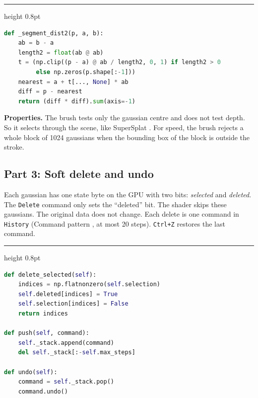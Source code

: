 \documentclass[9pt,twocolumn,a4paper]{extarticle}
\newenvironment{codebox}{\par\vspace{5pt}\noindent\begin{minipage}{\columnwidth}\hrule height 0.8pt\vspace{2pt}}{\end{minipage}\par\vspace{5pt}\noindent\ignorespaces}
\newcommand{\code}[1]{\texttt{#1}}
\begin{document}
\begin{codebox}
\begin{lstlisting}[language=Python,caption={\code{editor/brush.py}, \code{BrushTool.\_segment\_dist2}: capsule test},label={lst:capsule}]
def _segment_dist2(p, a, b):
    ab = b - a
    length2 = float(ab @ ab)
    t = (np.clip((p - a) @ ab / length2, 0, 1) if length2 > 0
         else np.zeros(p.shape[:-1]))
    nearest = a + t[..., None] * ab
    diff = p - nearest
    return (diff * diff).sum(axis=-1)
\end{lstlisting}
\end{codebox} 

\textbf{Properties.} The brush tests only the gaussian centre and does not test depth. So it selects through the scene, like SuperSplat \cite{supersplat}. For speed, the brush rejects a whole block of 1024 gaussians when the bounding box of the block is outside the stroke.

\subsection{Part 3: Soft delete and undo}
Each gaussian has one state byte on the GPU with two bits: \emph{selected} and \emph{deleted}. The \code{Delete} command only sets the ``deleted'' bit. The shader skips these gaussians. The original data does not change. Each delete is one command in \code{History} (Command pattern \cite{gamma1994design}, at most 20 steps). \code{Ctrl+Z} restores the last command.

\begin{codebox}
\begin{lstlisting}[language=Python,caption={\code{core/layer.py} and \code{core/history.py}: soft delete and undo},label={lst:history}]
def delete_selected(self):
    indices = np.flatnonzero(self.selection)
    self.deleted[indices] = True
    self.selection[indices] = False
    return indices

def push(self, command):
    self._stack.append(command)
    del self._stack[:-self.max_steps]

def undo(self):
    command = self._stack.pop()
    command.undo()
\end{lstlisting}
\end{codebox}
\end{document}
